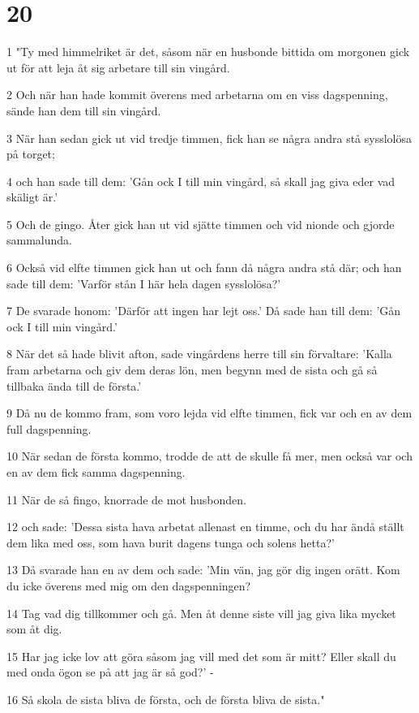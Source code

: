 \chapter{20}

\par 1 "Ty med himmelriket är det, såsom när en husbonde bittida om morgonen gick ut för att leja åt sig arbetare till sin vingård.
\par 2 Och när han hade kommit överens med arbetarna om en viss dagspenning, sände han dem till sin vingård.
\par 3 När han sedan gick ut vid tredje timmen, fick han se några andra stå sysslolösa på torget;
\par 4 och han sade till dem: 'Gån ock I till min vingård, så skall jag giva eder vad skäligt är.'
\par 5 Och de gingo. Åter gick han ut vid sjätte timmen och vid nionde och gjorde sammalunda.
\par 6 Också vid elfte timmen gick han ut och fann då några andra stå där; och han sade till dem: 'Varför stån I här hela dagen sysslolösa?'
\par 7 De svarade honom: 'Därför att ingen har lejt oss.' Då sade han till dem: 'Gån ock I till min vingård.'
\par 8 När det så hade blivit afton, sade vingårdens herre till sin förvaltare: 'Kalla fram arbetarna och giv dem deras lön, men begynn med de sista och gå så tillbaka ända till de första.'
\par 9 Då nu de kommo fram, som voro lejda vid elfte timmen, fick var och en av dem full dagspenning.
\par 10 När sedan de första kommo, trodde de att de skulle få mer, men också var och en av dem fick samma dagspenning.
\par 11 När de så fingo, knorrade de mot husbonden.
\par 12 och sade: 'Dessa sista hava arbetat allenast en timme, och du har ändå ställt dem lika med oss, som hava burit dagens tunga och solens hetta?'
\par 13 Då svarade han en av dem och sade: 'Min vän, jag gör dig ingen orätt. Kom du icke överens med mig om den dagspenningen?
\par 14 Tag vad dig tillkommer och gå. Men åt denne siste vill jag giva lika mycket som åt dig.
\par 15 Har jag icke lov att göra såsom jag vill med det som är mitt? Eller skall du med onda ögon se på att jag är så god?' -
\par 16 Så skola de sista bliva de första, och de första bliva de sista."
